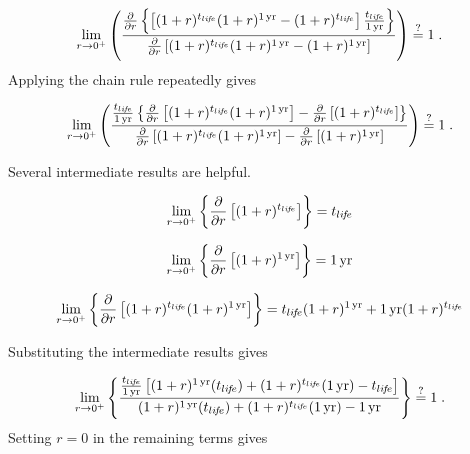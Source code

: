 \begin{equation}
  \lim_{r \to 0^+} \left(
  \frac{\frac{\partial}{\partial r} \left\{ \left[(1 + r)^{\tlife} (1 + r)^{\oneyr} - (1 + r)^{\tlife} \right] \frac{\tlife}{\oneyr} \right\}}
  {\frac{\partial}{\partial r} \left[ (1 + r)^{\tlife} (1 + r)^{\oneyr} - (1 + r)^{\oneyr}\right]}
  \right) \questionequal 1 \; .
\end{equation}
%
Applying the chain rule repeatedly gives

\begin{equation}
  \lim_{r \to 0^+} \left(
  \frac{\frac{\tlife}{\oneyr} 
      \left\{ \frac{\partial}{\partial r} \left[  (1 + r)^{\tlife} (1 + r)^{\oneyr} \right]  - 
              \frac{\partial}{\partial r} \left[  (1 + r)^{\tlife} \right] 
      \right\}}
  {\frac{\partial}{\partial r} \left[    (1 + r)^{\tlife} (1 + r)^{\oneyr} \right]  - 
              \frac{\partial}{\partial r} \left[  (1 + r)^{\oneyr} \right] }
  \right) \questionequal 1 \; .
\end{equation}

Several intermediate results are helpful.

\begin{equation}
  \lim_{r \to 0^+} \left\{\frac{\partial}{\partial r} \left[ (1 + r)^{t_{li\!f\!e}} \right] \right\} = t_{li\!f\!e}
\end{equation}

\begin{equation}
  \lim_{r \to 0^+} \left\{\frac{\partial}{\partial r} \left[ (1 + r)^{1\,\mathrm{yr}} \right] \right\} = 1\,\mathrm{yr}
\end{equation}

\begin{equation}
  \lim_{r \to 0^+} \left\{\frac{\partial}{\partial r} \left[ (1 + r)^{t_{li\!f\!e}} (1 + r)^{1\,\mathrm{yr}} \right] \right\} = t_{li\!f\!e} (1 + r)^{1\,\mathrm{yr}}  + 1\,\mathrm{yr} (1 + r)^{t_{li\!f\!e}} 
\end{equation}

Substituting the intermediate results gives

\begin{equation}
  \lim_{r \to 0^+} \left\{
                         \frac{\frac{\tlife}{\oneyr}
                         \left[ (1 + r)^{\oneyr} (\tlife) + 
                         (1 + r)^{\tlife} (\oneyr) - 
                         \tlife \right]}
                        {(1 + r)^{\oneyr} (\tlife) + 
                         (1 + r)^{\tlife} (\oneyr) - 
                         \oneyr}
                    \right\} \questionequal 1 \; .
\end{equation}
%
Setting $r = 0$ in the remaining terms gives

